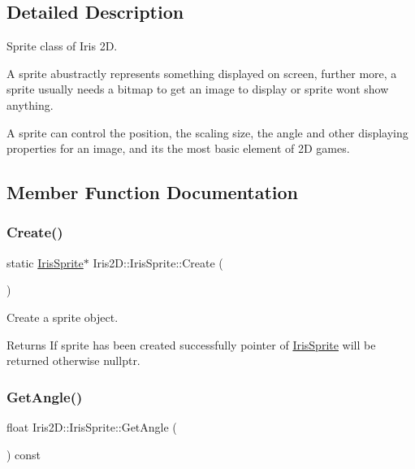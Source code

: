 \subsection{Detailed Description}
Sprite class of Iris 2D. 

A sprite abustractly represents something displayed on screen, further more, a sprite usually needs a bitmap to get an image to display or sprite won\textquotesingle{}t show anything.

A sprite can control the position, the scaling size, the angle and other displaying properties for an image, and it\textquotesingle{}s the most basic element of 2D games. 

\subsection{Member Function Documentation}
\mbox{\label{class_iris2_d_1_1_iris_sprite_ab68ea873fcd8521324c8497455dee852}} 
\subsubsection{\texorpdfstring{Create()}{Create()}}
{\footnotesize\ttfamily static \hyperlink{class_iris2_d_1_1_iris_sprite}{Iris\+Sprite}$\ast$ Iris2\+D\+::\+Iris\+Sprite\+::\+Create (\begin{DoxyParamCaption}{ }\end{DoxyParamCaption})\hspace{0.3cm}{\ttfamily [static]}}



Create a sprite object. 

\begin{DoxyReturn}{Returns}
If sprite has been created successfully pointer of \hyperlink{class_iris2_d_1_1_iris_sprite}{Iris\+Sprite} will be returned otherwise nullptr. 
\end{DoxyReturn}
\mbox{\label{class_iris2_d_1_1_iris_sprite_aef46b946bf5f46465ea164debdc78e57}} 
\subsubsection{\texorpdfstring{Get\+Angle()}{GetAngle()}}
{\footnotesize\ttfamily float Iris2\+D\+::\+Iris\+Sprite\+::\+Get\+Angle (\begin{DoxyParamCaption}{ }\end{DoxyParamCaption}) const}



